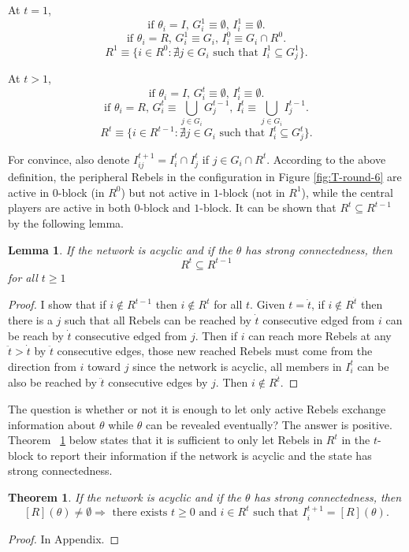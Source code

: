 \documentclass[12pt,letter]{article}
\newtheorem{theorem}{Theorem}
\newtheorem{lemma}{Lemma}[section]
\theoremstyle{definition}
\theoremstyle{remark}
\theoremstyle{claim}
\begin{document}
At $t=1$,
\[\text{if $\theta_i=I$, $G^{1}_i\equiv \emptyset$, $I^{1}_i\equiv \emptyset$.}\] 
\[\text{if $\theta_i=R$, $G^{1}_i\equiv G_i$, $I^{0}_i\equiv G_i\cap R^0$.}\] 
\[\text{$R^1\equiv \{i\in R^0: \nexists j\in G_i \text{ such that }I^1_i\subseteq G^1_j\}$.}\] 

At $t>1$, 
\[\text{if $\theta_i=I$, $G^{t}_i\equiv \emptyset$, $I^{t}_i\equiv \emptyset$.}\] 
\[\text{if $\theta_i=R$, $G^{t}_i\equiv \bigcup_{j\in G_i} G^{t-1}_j$, $I^{t}_i\equiv \bigcup_{j\in G_i} I^{t-1}_j$.}\] 
\[\text{$R^t\equiv \{i\in R^{t-1}: \nexists j\in G_i \text{ such that }I^t_i\subseteq G^t_j\}$.}\]



For convince, also denote $I^{t+1}_{ij}=I^t_i\cap I^t_j$ if $j\in G_i\cap R^{t}$.  According to the above definition, the peripheral Rebels in the configuration in Figure \ref{fig:T-round-6} are active in $0$-block (in $R^0$) but not active in $1$-block (not in $R^1$), while the central players are active in both $0$-block and $1$-block. It can be shown that $R^t\subseteq R^{t-1}$ by the following lemma. 
\begin{lemma}
\label{lemma_inclusion}
If the network is acyclic and if the $\theta$ has strong connectedness, then 
\[R^t\subseteq R^{t-1}\] for all $t\geq 1$
\end{lemma}
\begin{proof}
I show that if $i\notin R^{t-1}$ then $i\notin R^t$ for all $t$. Given $t=\dot{t}$, if $i\notin R^{\dot{t}}$ then there is a $j$ such that all Rebels can be reached by $\dot{t}$ consecutive edged from $i$ can be reach by $\dot{t}$ consecutive edged from $j$. Then if $i$ can reach more Rebels at any $\ddot{t}>\dot{t}$ by $\ddot{t}$ consecutive edges, those new reached Rebels must come from the direction from $i$ toward $j$ since the network is acyclic, all members in $I^{t}_i$ can be also be reached by $\ddot{t}$ consecutive edges by $j$. Then $i\notin R^{\ddot{t}}$. 
\end{proof}

The question is whether or not it is enough to let only active Rebels exchange information about $\theta$ while $\theta$ can be revealed eventually? The answer is positive. Theorem ~\ref{lemma_empty} below states that it is sufficient to only let Rebels in $R^t$ in the $t$-block to report their information if the network is acyclic and the state has strong connectedness. 
\begin{theorem}
\label{lemma_empty}
If the network is acyclic and if the $\theta$ has strong connectedness, then 
\[[R](\theta)\neq \emptyset \Rightarrow \text{ there exists } t\geq 0 \text{ and } i\in R^t \text{ such that }I^{t+1}_i=[R](\theta).\] 
\end{theorem}
\begin{proof}
In Appendix.
\end{proof}
\end{document}
